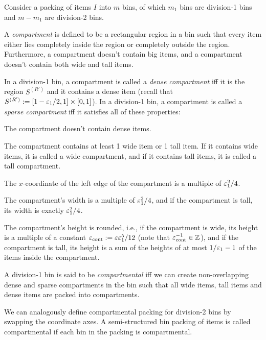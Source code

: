 \begin{definition}
\label{defn:compartmental}
Consider a \semiStrucHyp{} packing of items $I$ into $m$ bins,
of which $m_1$ bins are division-1 bins and $m - m_1$ are division-2 bins.

A \emph{compartment} is defined to be a rectangular region in a bin such that every item
either lies completely inside the region or completely outside the region.
Furthermore, a compartment doesn't contain big items,
and a compartment doesn't contain both wide and tall items.

In a division-1 bin, a compartment is called a \emph{dense compartment} iff
it is the region $S^{(R')}$ and it contains a dense item
(recall that $S^{(R')} := [1-\varepsilon_1/2, 1] \times [0, 1]$).
In a division-1 bin, a compartment is called a \emph{sparse compartment}
iff it satisfies all of these properties:
\begin{tightemize}
\item The compartment doesn't contain dense items.
\item The compartment contains at least 1 wide item or 1 tall item.
    If it contains wide items, it is called a wide compartment,
    and if it contains tall items, it is called a tall compartment.
\item The $x$-coordinate of the left edge of the compartment
    is a multiple of $\varepsilon_1^2/4$.
\item The compartment's width is a multiple of $\varepsilon_1^2/4$,
    and if the compartment is tall, its width is exactly $\varepsilon_1^2/4$.
\item \label{item:compartment:height}\empty
    The compartment's height is rounded, i.e., if the compartment is wide,
    its height is a multiple of a constant $\varepsilon_{\mathrm{cont}} := \varepsilon\varepsilon_1^5/12$
    (note that $\varepsilon_{\mathrm{cont}}^{-1} \in \mathbb{Z}$),
    and if the compartment is tall, its height is a sum of the heights of
    at most $1/\varepsilon_1-1$ of the items inside the compartment.
\end{tightemize}

A division-1 bin is said to be \emph{compartmental}
iff we can create non-overlapping dense and sparse compartments in the bin such that
all wide items, tall items and dense items are packed into compartments.

We can analogously define compartmental packing for division-2 bins
by swapping the coordinate axes.
A semi-structured bin packing of items is called compartmental
if each bin in the packing is compartmental.
\end{definition}

